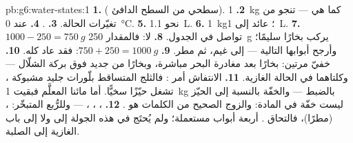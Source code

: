 \begin{solution}{pb:g6:water-states:1}
\textbf{1.}  ( سطحي من السطح الدافئ).
\textbf{2.} \qty{1}{kg} كما هي ---  تنجو من تغيّرات
الحالة.
\textbf{3.} .
\textbf{4.} عند \qty{0}{\celsius}.
\textbf{5.} نحو \qty{1.1}{L}.
\textbf{6.}  \qty{1}{kg}؛  عائد إلى \qty{1}{L}.
\textbf{7.} $1000 - 250 = \qty{750}{g}$ تواصل في الجدول.
\textbf{8.} لا: فالمقدار \qty{250}{g} يركب  بخارًا سليمًا؛
وأرجح أبوابها التالية  --- إلى غيم، ثم مطر.
\textbf{9.} $750 + 250 = \qty{1000}{g}$: فقد عاد 
كله.
\textbf{10.} خفيّ مرتين: بخارًا بعد مغادرة البحر مباشرة،
وبخارًا من جديد فوق بركة الشلّال --- وكلتاهما في الحالة
الغازية.
\textbf{11.} الانتفاش أمر \emph{}: فالثلج المتساقط بلّورات
جليد مشبوكة ، تشغل حيّزًا سخيًّا. أما \emph{} مائنا
المعلَّم فبقيت \qty{1}{kg} بالضبط --- والخفّة بالنسبة إلى
الحيّز ليست خفّة في المادة: والزوج الصحيح من الكلمات هو 
.
\textbf{12.} ، ، ،  --- وللرُّبع
المتبخّر: ،  (مطرًا)، فالتحاق . أربعة أبواب
مستعملة؛ ولم يُحتَج في هذه الجولة إلى  ولا إلى باب
الغازية إلى الصلبة.
\end{solution}
